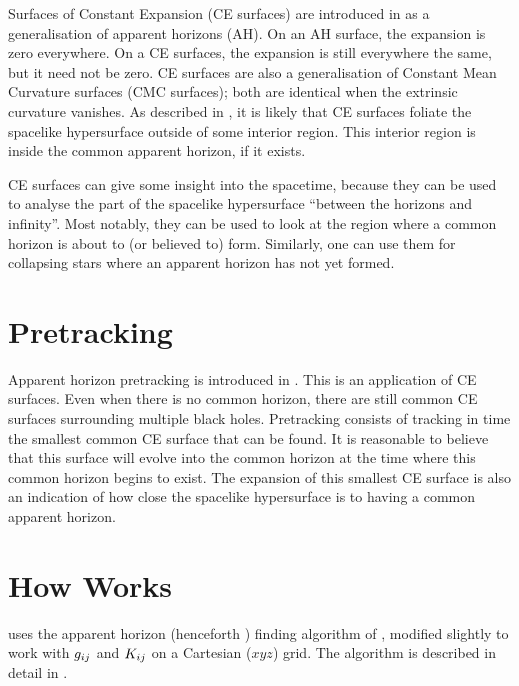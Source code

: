 Surfaces of Constant Expansion (CE surfaces) are introduced in
\cite{AHFinderDirect/Schnetter03a} as a generalisation of
apparent horizons (AH).  On an AH surface, the expansion is zero
everywhere.  On a CE surfaces, the expansion is still everywhere the
same, but it need not be zero.  CE surfaces are also a generalisation
of Constant Mean Curvature surfaces (CMC surfaces); both are identical
when the extrinsic curvature vanishes.  As described in
\cite{AHFinderDirect/Schnetter03a}, it is likely that CE
surfaces foliate the spacelike hypersurface outside of some interior
region.  This interior region is inside the common apparent horizon,
if it exists.

CE surfaces can give some insight into the spacetime, because they can
be used to analyse the part of the spacelike hypersurface ``between
the horizons and infinity''.  Most notably, they can be used to look
at the region where a common horizon is about to (or believed to)
form.  Similarly, one can use them for collapsing stars where an
apparent horizon has not yet formed.


\section{Pretracking}

Apparent horizon pretracking is introduced in
\cite{AHFinderDirect/Schnetter03a}.  This is an application
of CE surfaces.  Even when there is no common horizon, there are still
common CE surfaces surrounding multiple black holes.  Pretracking
consists of tracking in time the smallest common CE surface that can
be found.  It is reasonable to believe that this surface will evolve
into the common horizon at the time where this common horizon begins
to exist.  The expansion of this smallest CE surface is also an
indication of how close the spacelike hypersurface is to having a
common apparent horizon.


\section{How  Works}
\label{AHFinderDirect/sect-how-ahfinderdirect-works}

 uses the apparent horizon
(henceforth ) finding algorithm of
\cite{AHFinderDirect/Thornburg95},
modified slightly to work with $g_{ij}$ and $K_{ij}$ on a Cartesian ($xyz$)
grid.  The algorithm is described in detail in
\cite{AHFinderDirect/Thornburg2003:AH-finding}.

